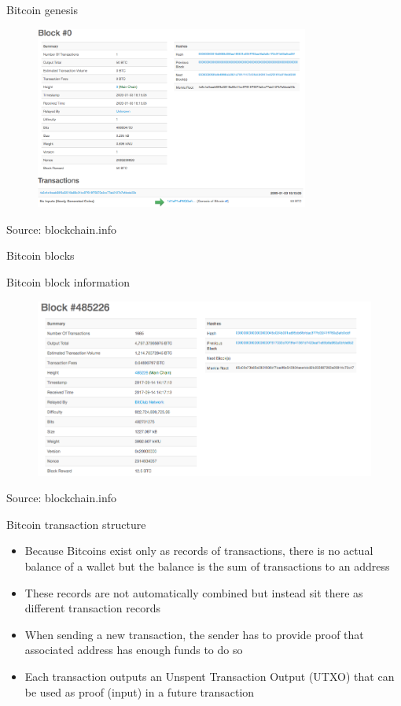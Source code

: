 \documentclass[10pt]{beamer}
\begin{document}
\begin{frame}{Bitcoin genesis}
	\begin{figure}[]
		\centering
		\includegraphics  [width=90mm]{Images/genesis}
	\end{figure}
	\begin{tiny}
		Source: blockchain.info
	\end{tiny}
\end{frame}


\begin{frame}{Bitcoin blocks}
	\begin{scriptsize}
		Bitcoin block information
	\end{scriptsize}
	\begin{figure}[]
		\centering
		\includegraphics  [width=4.in]{Images/block}
	\end{figure}
	\begin{tiny}
		Source: blockchain.info
	\end{tiny}
\end{frame}



\begin{frame}{Bitcoin transaction structure}
	\begin{itemize}
		\item Because Bitcoins exist only as records of transactions, there is no actual balance of a wallet but the balance is the sum of transactions to an address
		\item These records are not automatically combined but instead sit there as different transaction records
		\item When sending a new transaction, the sender has to provide proof that associated address has enough funds to do so
		\item Each transaction outputs an Unspent Transaction Output (UTXO) that can be used as proof (input) in a future transaction
	\end{itemize}
\end{frame}
\end{document}
